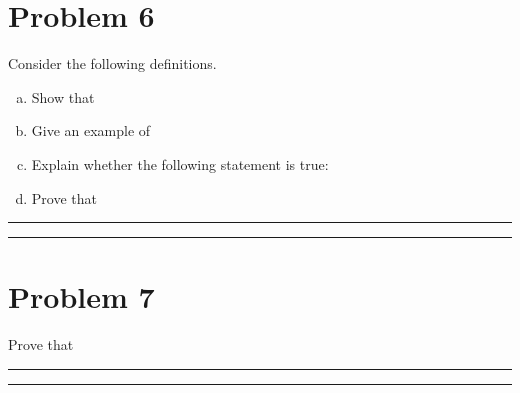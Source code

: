 \documentclass{article}
\theoremstyle{definition}
\newenvironment{solution}{\bigskip\hrule{\hfill}}{\bigskip\hrule{\hfill}} %
\begin{document}

\newpage


\section*{Problem 6}

Consider the following definitions.

\begin{enumerate}[a)] %
    \item Show that

    \item Give an example of

    \item Explain whether the following statement is true:

    \item Prove that 
\end{enumerate}

\begin{solution}


\end{solution}


\newpage


\section*{Problem 7}

Prove that 

\begin{solution}


\end{solution}

\end{document}
